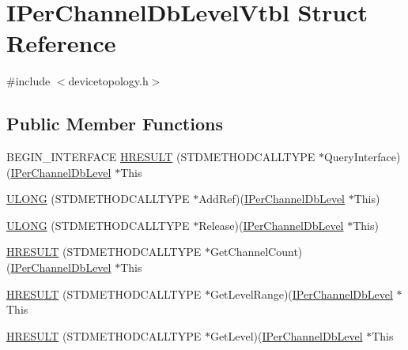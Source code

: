 \hypertarget{struct_i_per_channel_db_level_vtbl}{}\section{I\+Per\+Channel\+Db\+Level\+Vtbl Struct Reference}
\label{struct_i_per_channel_db_level_vtbl}


{\ttfamily \#include $<$devicetopology.\+h$>$}

\subsection*{Public Member Functions}
\begin{DoxyCompactItemize}
\item 
B\+E\+G\+I\+N\+\_\+\+I\+N\+T\+E\+R\+F\+A\+CE \hyperlink{struct_i_per_channel_db_level_vtbl_a7f645423469a3c771073c2fc9079d95a}{H\+R\+E\+S\+U\+LT} (S\+T\+D\+M\+E\+T\+H\+O\+D\+C\+A\+L\+L\+T\+Y\+PE $\ast$Query\+Interface)(\hyperlink{devicetopology_8h_a32fe99744d7ec8080119fb32ce0c72d6}{I\+Per\+Channel\+Db\+Level} $\ast$This
\item 
\hyperlink{struct_i_per_channel_db_level_vtbl_a2050c25ca9da38655d033710ebb3cab8}{U\+L\+O\+NG} (S\+T\+D\+M\+E\+T\+H\+O\+D\+C\+A\+L\+L\+T\+Y\+PE $\ast$Add\+Ref)(\hyperlink{devicetopology_8h_a32fe99744d7ec8080119fb32ce0c72d6}{I\+Per\+Channel\+Db\+Level} $\ast$This)
\item 
\hyperlink{struct_i_per_channel_db_level_vtbl_ae9db232d721113571f528bbda49aee69}{U\+L\+O\+NG} (S\+T\+D\+M\+E\+T\+H\+O\+D\+C\+A\+L\+L\+T\+Y\+PE $\ast$Release)(\hyperlink{devicetopology_8h_a32fe99744d7ec8080119fb32ce0c72d6}{I\+Per\+Channel\+Db\+Level} $\ast$This)
\item 
\hyperlink{struct_i_per_channel_db_level_vtbl_a71498035f22ff02298ca12c2a25248ed}{H\+R\+E\+S\+U\+LT} (S\+T\+D\+M\+E\+T\+H\+O\+D\+C\+A\+L\+L\+T\+Y\+PE $\ast$Get\+Channel\+Count)(\hyperlink{devicetopology_8h_a32fe99744d7ec8080119fb32ce0c72d6}{I\+Per\+Channel\+Db\+Level} $\ast$This
\item 
\hyperlink{struct_i_per_channel_db_level_vtbl_a3d4f33f6f6b296a6637cf4baa62236c2}{H\+R\+E\+S\+U\+LT} (S\+T\+D\+M\+E\+T\+H\+O\+D\+C\+A\+L\+L\+T\+Y\+PE $\ast$Get\+Level\+Range)(\hyperlink{devicetopology_8h_a32fe99744d7ec8080119fb32ce0c72d6}{I\+Per\+Channel\+Db\+Level} $\ast$This
\item 
\hyperlink{struct_i_per_channel_db_level_vtbl_a9b846ade8c9130adc61f7377dd0477f6}{H\+R\+E\+S\+U\+LT} (S\+T\+D\+M\+E\+T\+H\+O\+D\+C\+A\+L\+L\+T\+Y\+PE $\ast$Get\+Level)(\hyperlink{devicetopology_8h_a32fe99744d7ec8080119fb32ce0c72d6}{I\+Per\+Channel\+Db\+Level} $\ast$This

\end{DoxyCompactItemize}
